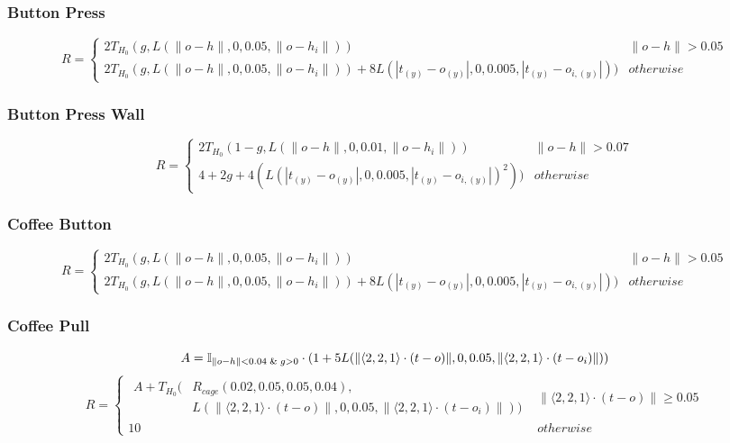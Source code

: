 {\subsubsection{Button Press}
\[R=\left\{
\begin{array}{ll}
      2T_{H_0}(
        g,
        L(\lVert o - h \rVert, 0, 0.05, \lVert o - h_i \rVert))
        & \lVert o - h \rVert > 0.05 \\
      2T_{H_0}(
        g,
        L(\lVert o - h \rVert, 0, 0.05, \lVert o - h_i \rVert)) +
        8L(| t_{(y)} - o_{(y)} |, 0, 0.005, | t_{(y)} - o_{i,(y)} |))
        & otherwise
\end{array} \right. \]

\subsubsection{Button Press Wall}
\[R=\left\{
\begin{array}{ll}
      2T_{H_0}(
        1-g,
        L(\lVert o - h \rVert, 0, 0.01, \lVert o - h_i \rVert))
        & \lVert o - h \rVert > 0.07 \\
      4 + 2g + 4(L(| t_{(y)} - o_{(y)} |, 0, 0.005, | t_{(y)} - o_{i,(y)} |)^2))
        & otherwise
\end{array} \right. \]

\subsubsection{Coffee Button}
\[R=\left\{
\begin{array}{ll}
      2T_{H_0}(
        g,
        L(\lVert o - h \rVert, 0, 0.05, \lVert o - h_i \rVert))
        & \lVert o - h \rVert > 0.05 \\
      2T_{H_0}(
        g,
        L(\lVert o - h \rVert, 0, 0.05, \lVert o - h_i \rVert)) +
        8L(| t_{(y)} - o_{(y)} |, 0, 0.005, | t_{(y)} - o_{i,(y)} |))
        & otherwise
\end{array} \right. \]

\subsubsection{Coffee Pull}
\[
A=\mathbb{I}_{\lVert o - h \rVert < 0.04 \And g > 0} \cdot
    (1 + 5L(\lVert \langle2,2,1\rangle \cdot (t - o) \rVert, 0, 0.05, \lVert \langle2,2,1\rangle \cdot (t - o_i) \rVert))
\]
\[R=\left\{
\begin{array}{ll}
    \begin{aligned}
      A + T_{H_0}(
        & R_{cage}(0.02,0.05,0.05,0.04), \\
        & L(\lVert \langle2,2,1\rangle \cdot (t - o) \rVert, 0, 0.05, \lVert \langle2,2,1\rangle \cdot (t - o_i) \rVert))
    \end{aligned}
        & \lVert \langle2,2,1\rangle \cdot (t - o) \rVert\geq 0.05 \\
      10 & otherwise
\end{array} \right. \]

}
